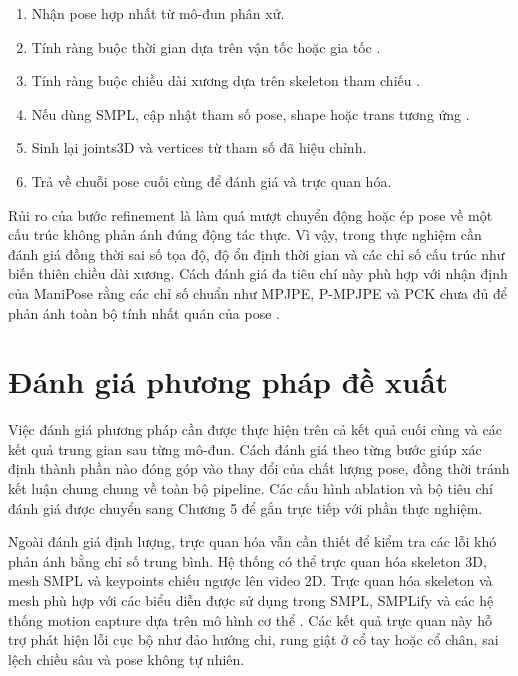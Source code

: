 \documentclass[../DoAn.tex]{subfiles}
\begin{document}
\begin{enumerate}[leftmargin=*, label=\arabic*.]
    \item Nhận pose hợp nhất từ mô-đun phân xử.
    \item Tính ràng buộc thời gian dựa trên vận tốc hoặc gia tốc \cite{physcap2020}.
    \item Tính ràng buộc chiều dài xương dựa trên skeleton tham chiếu \cite{keller2023skin}.
    \item Nếu dùng SMPL, cập nhật tham số pose, shape hoặc trans tương ứng \cite{smpl2015,smplify2016}.
    \item Sinh lại joints3D và vertices từ tham số đã hiệu chỉnh.
    \item Trả về chuỗi pose cuối cùng để đánh giá và trực quan hóa.
\end{enumerate}

Rủi ro của bước refinement là làm quá mượt chuyển động hoặc ép pose về một cấu trúc không phản ánh đúng động tác thực. Vì vậy, trong thực nghiệm cần đánh giá đồng thời sai số tọa độ, độ ổn định thời gian và các chỉ số cấu trúc như biến thiên chiều dài xương. Cách đánh giá đa tiêu chí này phù hợp với nhận định của ManiPose rằng các chỉ số chuẩn như MPJPE, P-MPJPE và PCK chưa đủ để phản ánh toàn bộ tính nhất quán của pose \cite{manipose2024}.

\section{Đánh giá phương pháp đề xuất}
\label{sec:evaluation_design}

Việc đánh giá phương pháp cần được thực hiện trên cả kết quả cuối cùng và các kết quả trung gian sau từng mô-đun. Cách đánh giá theo từng bước giúp xác định thành phần nào đóng góp vào thay đổi của chất lượng pose, đồng thời tránh kết luận chung chung về toàn bộ pipeline. Các cấu hình ablation và bộ tiêu chí đánh giá được chuyển sang Chương 5 để gắn trực tiếp với phần thực nghiệm.

Ngoài đánh giá định lượng, trực quan hóa vẫn cần thiết để kiểm tra các lỗi khó phản ánh bằng chỉ số trung bình. Hệ thống có thể trực quan hóa skeleton 3D, mesh SMPL và keypoints chiếu ngược lên video 2D. Trực quan hóa skeleton và mesh phù hợp với các biểu diễn được sử dụng trong SMPL, SMPLify và các hệ thống motion capture dựa trên mô hình cơ thể \cite{smpl2015,smplify2016}. Các kết quả trực quan này hỗ trợ phát hiện lỗi cục bộ như đảo hướng chi, rung giật ở cổ tay hoặc cổ chân, sai lệch chiều sâu và pose không tự nhiên.
\end{document}
